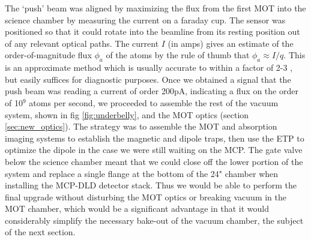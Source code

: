 	The `push' beam was aligned by maximizing the flux from the first MOT into the science chamber by measuring the current on a faraday cup.
	The sensor was positioned so that it could rotate into the beamline from its resting position out of any relevant optical paths.
	The current $I$ (in amps) gives an estimate of the order-of-magnitude flux $\phi_a$ of the atoms by the rule of thumb that $\phi_a\approx I/q$.
	This is an approximate method which is usually accurate to within a factor of 2-3 \cite{}, but easily suffices for diagnostic purposes.
	Once we obtained a signal that the push beam was reading a current of order 200pA, indicating a flux on the order of 10$^9$ \mhe atoms per second, we proceeded to assemble the rest of the vacuum system, shown in fig \ref{fig:underbelly}, and the MOT optics (section \ref{sec:new_optics}).
	The strategy was to assemble the MOT and absorption imaging systems to establish the magnetic and dipole traps, then use the ETP to optimize the dipole in the case we were still waiting on the MCP.
	The gate valve below the science chamber meant that we could close off the lower portion of the system and replace a single flange at the bottom of the 24" chamber when installing the MCP-DLD detector stack.
	Thus we would be able to perform the final upgrade without disturbing the MOT optics or breaking vacuum in the MOT chamber, which would be a significant advantage in that it would considerably simplify the necessary bake-out of the vacuum chamber, the subject of the next section.
	

